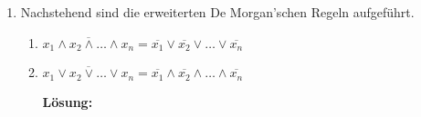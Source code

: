 \documentclass[paper=a4,fontsize=11pt]{scrartcl}%
\numberwithin{equation}{section}
\newenvironment{solution}
	{
		\color{Blue}
		\textbf{Lösung:}
	}{}
\begin{document}
\begin{enumerate}
\begin{enumerate}[resume]
		\begin{solution}

		Gegenbeispiel: $x= 0,y= 0,z= 1$
		\begin{align*}
		(x \lor y) \not \Leftrightarrow (y \lor z) &= (0 \lor 1) \not \Leftrightarrow (0 \lor 1)\\
		&= 1 \not \Leftrightarrow 1\\
		(x \not \Leftrightarrow y) \lor z &= (0 \not \Leftrightarrow 0) \land 1\\
		&= 1
		\end{align*}
		\end{solution}
		\item $(x \land z) \Leftrightarrow (y \land z) = (x \Leftrightarrow y) \land z$
		
		\begin{solution}
		
		Gegenbeispiel: $x= 0,y= 0,z= 0$
		\begin{align*}
		(x \land z) \Leftrightarrow (y \land z) &= (0 \land 0) \Leftrightarrow (0 \land 0)\\
		&= 0 \Leftrightarrow 0\\
		&= 1\\
		(x \Leftrightarrow y) \land z &= (0 \not \Leftrightarrow 0) \land 0\\
		&= 0
		\end{align*}
		\end{solution}
	\end{enumerate}
	\item Nachstehend sind die erweiterten De Morgan'schen Regeln aufgeführt.
	\begin{enumerate}
		\item $\overline{x_1 \land x_2 \land \ldots \land x_n} = \overline{x_1} \lor \overline{x_2} \lor \ldots \lor \overline{x_n}$
		\item $\overline{x_1 \lor x_2 \lor \ldots \lor x_n} = \overline{x_1} \land \overline{x_2} \land \ldots \land \overline{x_n}$
		
		\begin{solution}
		

\end{solution}
\end{enumerate}
\end{enumerate}
\end{document}

